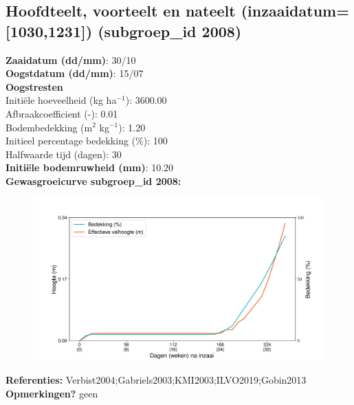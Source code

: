 \documentclass{article}
\begin{document}
 \subsection{Hoofdteelt, voorteelt en nateelt (inzaaidatum=[1030,1231]) (subgroep\_id 2008)} 
  \textbf{Zaaidatum (dd/mm)}: 30/10  \vspace{0.10cm} \\ 
  \textbf{Oogstdatum (dd/mm)}: 15/07  \vspace{0.10cm} \\ 
  \textbf{Oogstresten} \vspace{0.05cm} \\ 
  \tab Initi\"{e}le hoeveelheid (kg ha$^{-1}$): 3600.00 \vspace{0.05cm} \\ 
  \tab Afbraakcoefficient (-): 0.01 \vspace{0.05cm} \\ 
  \tab Bodembedekking (m$^2$ kg$^{-1}$): 1.20 \vspace{0.05cm} \\ 
  \tab Initieel percentage bedekking (\%): 100 \vspace{0.05cm} \\ 
  \tab Halfwaarde tijd (dagen): 30 \vspace{0.05cm} \\ 
  \textbf{Initi\"{e}le bodemruwheid (mm)}: 10.20 \vspace{0.05cm} \\ 
  \textbf{Gewasgroeicurve subgroep\_id 2008:} 
 \begin{center} \begin{figure}[H] \includegraphics[width=12.5cm]{temp/2008.png} \end{figure} \end{center} 
  \textbf{Referenties:} Verbist2004;Gabriels2003;KMI2003;ILVO2019;Gobin2013 \vspace{0.10cm} \\ 
  \textbf{Opmerkingen?} geen \vspace{0.10cm} \\ 
 \newpage 
\end{document}
